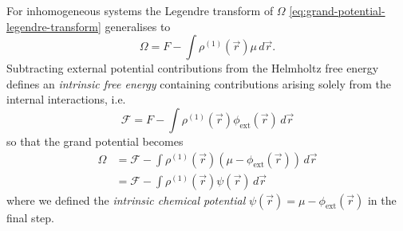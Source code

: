 For inhomogeneous systems the Legendre transform of $\Omega$ \eqref{eq:grand-potential-legendre-transform} generalises to
\begin{equation}
  \Omega = F - \int \rho^{(1)}(\vec{r}) \mu \, d\vec{r}.
\end{equation}
Subtracting external potential contributions from the Helmholtz free energy defines an \emph{intrinsic free energy} containing contributions arising solely from the internal interactions, i.e.\
\begin{equation}\label{eq:intrinsic-free-energy}
  \mathcal{F}
  =
  F - \int \rho^{(1)}(\vec{r}) \phi_\mathrm{ext}(\vec{r}) \, d\vec{r}
\end{equation}
so that the grand potential becomes
\begin{equation}\label{eq:dft-grand-potential}
  \begin{split}
    \Omega
    &=
    \mathcal{F}
    - \int \rho^{(1)}(\vec{r}) (\mu - \phi_\mathrm{ext}(\vec{r})) \, d\vec{r}
    \\ &=
    \mathcal{F}
    - \int \rho^{(1)}(\vec{r}) \psi(\vec{r}) \, d\vec{r}
  \end{split}
\end{equation}
where we defined the \emph{intrinsic chemical potential} $\psi(\vec{r}) = \mu - \phi_\mathrm{ext}(\vec{r})$ in the final step.

